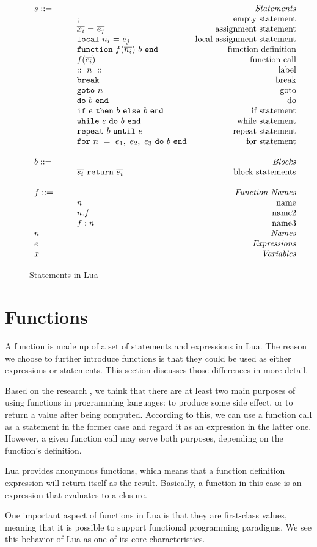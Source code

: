 \begin{figure}
\caption{Statements in Lua}
\label{fig:LuaStat}
\[
\begin{array}{llr}
  \mydefhead{s ::=\qquad\qquad\qquad\qquad}{Statements}
  \mydefcase{;}{empty statement}
  \mydefcase{\assign x e}{assignment statement}
  \mydefcase{\local n e}{local assignment statement}
  \mydefcase{\function f n b}{function definition}
  \mydefcase{f(\overline{e_i})}{function call}
  \mydefcase{::~n~::}{label}
  \mydefcase{\tt break}{break}
  \mydefcase{{\tt goto} ~n}{goto}
  \mydefcase{\doe b}{do}
  \mydefcase{\ife e b b}{if statement}
  \mydefcase{\whilee e b}{while statement}
  \mydefcase{\repeate e b}{repeat statement}
  \mydefcase{\for n e b}{for statement}
  \\
  \mydefhead{b ::=\qquad\qquad\qquad\qquad}{Blocks}
  \mydefcase{\overline{s_i}~{\tt return}~\overline{e_i}}{block statements}
  \\
  \mydefhead{f ::=\qquad\qquad\qquad\qquad}{Function Names}
  \mydefcase{n}{name}
  \mydefcase{n.f}{name2}
  \mydefcase{f:n}{name3}
  \mydefhead{n \qquad\qquad\qquad\qquad}{Names}
  \mydefhead{e \qquad\qquad\qquad\qquad}{Expressions}
  \mydefhead{x \qquad\qquad\qquad\qquad}{Variables}
\end{array}
\]
\end{figure}

\section{Functions}
A function is made up of a set of statements and expressions in Lua. The reason we choose to further introduce functions is that they could be used as either expressions or statements.
This section discusses those differences in more detail.

Based on the research \cite{PIL}, we think that there are at least two main purposes of using functions in programming languages: to produce some side effect, or to return a value after being computed. According to this, we can use a function call as a statement in the former case and regard it as an expression in the latter one. However, a given function call may serve both purposes, depending on the function's definition.

Lua provides anonymous functions, which means that a function definition expression will return itself as the result. Basically, a function in this case is an expression that evaluates to a closure.

One important aspect of functions in Lua is that they are first-class values,
meaning that it is possible to support functional programming paradigms.
We see this behavior of Lua as one of its core characteristics.

